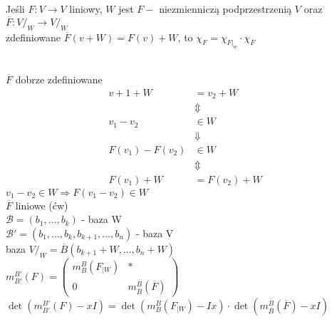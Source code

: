 \begin{ft} 
    Jeśli $F: V \to V$ liniowy, $W$ jest $F-$ niezmienniczą podprzestrzenią $V$ oraz $\overline F: V/_{W} \to V/_W$ \\ 
    zdefiniowane $\overline F (v+W) = F(v) + W$, to $\chi_F = \chi_{F|_w} \cdot \chi_{\overline F}$
\end{ft} 
\begin{dd} ~\\ 
    $\overline F$ dobrze zdefiniowane 
    \begin{align*}
        v+1 + W &= v_2 + W  \\ 
                &\Updownarrow \\
        v_1 - v_2 &\in W  \\ 
                  &\Downarrow  \\ 
        F(v_1) - F(v_2) &\in W \\ 
                        &\Updownarrow \\
        F(v_1) + W &= F(v_2) + W
    \end{align*} 
    $v_1 - v_2 \in W \Rightarrow F(v_1 - v_2) \in W$ \\ 
    $\overline F$ liniowe (ćw) \\ 
    $\mathcal B = (b_1,\ldots,b_k)$ - baza W \\ 
    $\mathcal B' = (b_1,\ldots,b_k,b_{k+1},\ldots,b_n)$ - baza V \\ 
    baza $V/_W = \overline B (b_{k+1}+W,\ldots,b_n+W)$ \\ 
    $m_{B'}^{B'} (F) = \begin{pmatrix} m_B^B (F_{|W}) & \ast \\ 0 & m_{\overline B}^{\overline B}(\overline F) \end{pmatrix}$ \\
    $\det(m_{B'}^{B'} (F) - xI) = \det (m_B^B (F_{|{W}}) - Ix) \cdot 
    \det (m_{\overline B}^{\overline B} (\overline F) - xI)$
\end{dd}
